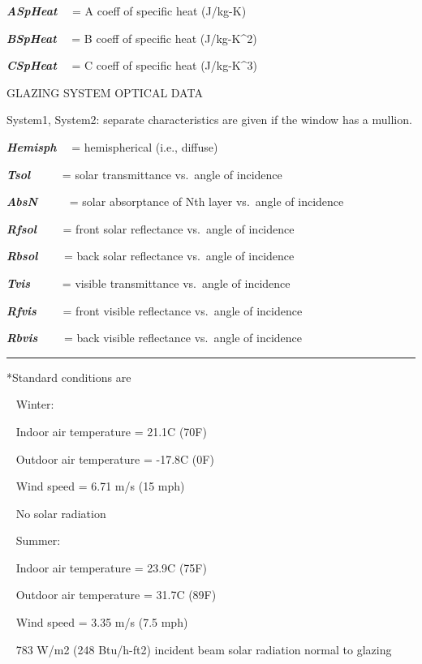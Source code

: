 \textbf{\emph{ASpHeat}}~~ = A coeff of specific heat (J/kg-K)

\textbf{\emph{BSpHeat}}~~ = B coeff of specific heat (J/kg-K\^{}2)

\textbf{\emph{CSpHeat}}~~ = C coeff of specific heat (J/kg-K\^{}3)

GLAZING SYSTEM OPTICAL DATA

System1, System2: separate characteristics are given if the window has a mullion.

\textbf{\emph{Hemisph}}~~ = hemispherical (i.e., diffuse)

\textbf{\emph{Tsol}}~~~~~ = solar transmittance vs.~angle of incidence

\textbf{\emph{AbsN}}~~~~~ = solar absorptance of Nth layer vs.~angle of incidence

\textbf{\emph{Rfsol}}~~~~ = front solar reflectance vs.~angle of incidence

\textbf{\emph{Rbsol}}~~~~ = back solar reflectance vs.~angle of incidence

\textbf{\emph{Tvis}}~~~~~ = visible transmittance vs.~angle of incidence

\textbf{\emph{Rfvis}}~~~~ = front visible reflectance vs.~angle of incidence

\textbf{\emph{Rbvis}}~~~~ = back visible reflectance vs.~angle of incidence

\begin{center}\rule{0.5\linewidth}{\linethickness}\end{center}

*Standard conditions are

~ Winter:

~ Indoor air temperature = 21.1C (70F)

~ Outdoor air temperature = -17.8C (0F)

~ Wind speed = 6.71 m/s (15 mph)

~ No solar radiation

~ Summer:

~ Indoor air temperature = 23.9C (75F)

~ Outdoor air temperature = 31.7C (89F)

~ Wind speed = 3.35 m/s (7.5 mph)

~ 783 W/m2 (248 Btu/h-ft2) incident beam solar radiation normal to glazing
